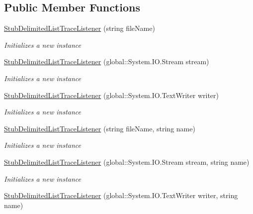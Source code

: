 \subsection*{Public Member Functions}
\begin{DoxyCompactItemize}
\item 
\hyperlink{class_system_1_1_diagnostics_1_1_fakes_1_1_stub_delimited_list_trace_listener_af45632df44d7a2c5ebacc7683d265e6e}{Stub\-Delimited\-List\-Trace\-Listener} (string file\-Name)
\begin{DoxyCompactList}\small\item\em Initializes a new instance\end{DoxyCompactList}\item 
\hyperlink{class_system_1_1_diagnostics_1_1_fakes_1_1_stub_delimited_list_trace_listener_ab7a26f35f2026731427a25fa85fe9393}{Stub\-Delimited\-List\-Trace\-Listener} (global\-::\-System.\-I\-O.\-Stream stream)
\begin{DoxyCompactList}\small\item\em Initializes a new instance\end{DoxyCompactList}\item 
\hyperlink{class_system_1_1_diagnostics_1_1_fakes_1_1_stub_delimited_list_trace_listener_acc02551e1c8d03db7abff033cb165101}{Stub\-Delimited\-List\-Trace\-Listener} (global\-::\-System.\-I\-O.\-Text\-Writer writer)
\begin{DoxyCompactList}\small\item\em Initializes a new instance\end{DoxyCompactList}\item 
\hyperlink{class_system_1_1_diagnostics_1_1_fakes_1_1_stub_delimited_list_trace_listener_a6fd746c3c0375caad7932f54378ddc39}{Stub\-Delimited\-List\-Trace\-Listener} (string file\-Name, string name)
\begin{DoxyCompactList}\small\item\em Initializes a new instance\end{DoxyCompactList}\item 
\hyperlink{class_system_1_1_diagnostics_1_1_fakes_1_1_stub_delimited_list_trace_listener_a4c94a05e63d507d3fa8ba034021c5fee}{Stub\-Delimited\-List\-Trace\-Listener} (global\-::\-System.\-I\-O.\-Stream stream, string name)
\begin{DoxyCompactList}\small\item\em Initializes a new instance\end{DoxyCompactList}\item 
\hyperlink{class_system_1_1_diagnostics_1_1_fakes_1_1_stub_delimited_list_trace_listener_a8a2de67c96298ed311e9e0931a2e43e8}{Stub\-Delimited\-List\-Trace\-Listener} (global\-::\-System.\-I\-O.\-Text\-Writer writer, string name)

\end{DoxyCompactItemize}
